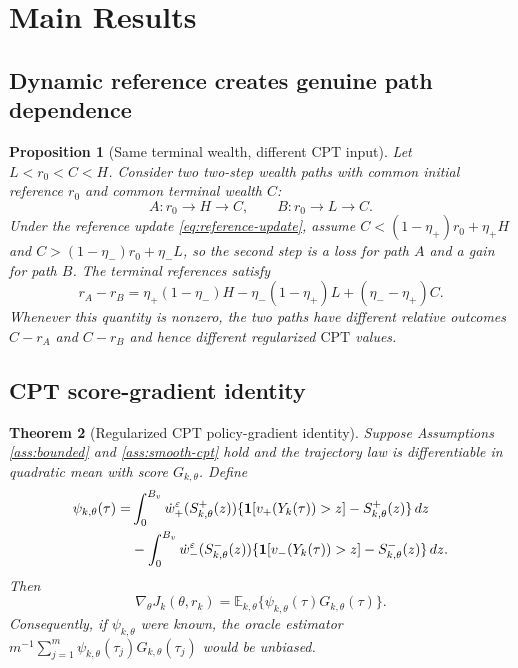 \documentclass[11pt]{article}
\newtheorem{theorem}{Theorem}[section]
\newtheorem{proposition}[theorem]{Proposition}
\newcommand{\E}{\mathbb E}
\newcommand{\1}{\mathbf 1}
\newcommand{\CPT}{\ensuremath{\mathrm{CPT}}\xspace}
\newcommand{\eps}{\varepsilon}
\newcommand{\etaP}{\eta_{+}}
\newcommand{\etaM}{\eta_{-}}
\begin{document}
\section{Main Results}\label{sec:results}

\subsection{Dynamic reference creates genuine path dependence}

\begin{proposition}[Same terminal wealth, different \CPT input]\label{prop:path-dependence}
Let $L<r_0<C<H$.  Consider two two-step wealth paths with common initial reference $r_0$ and common terminal wealth $C$:
\[
 A: r_0\to H\to C,
 \qquad
 B: r_0\to L\to C.
\]
Under the reference update \eqref{eq:reference-update}, assume $C< (1-\etaP)r_0+\etaP H$ and $C>(1-\etaM)r_0+\etaM L$, so the second step is a loss for path $A$ and a gain for path $B$.  The terminal references satisfy
\begin{equation}\label{eq:path-diff}
 r_A-r_B=\etaP(1-\etaM)H-\etaM(1-\etaP)L+(\etaM-\etaP)C.
\end{equation}
Whenever this quantity is nonzero, the two paths have different relative outcomes $C-r_A$ and $C-r_B$ and hence different regularized \CPT values.
\end{proposition}

\subsection{CPT score-gradient identity}

\begin{theorem}[Regularized \CPT policy-gradient identity]\label{thm:gradient-identity}
Suppose Assumptions \ref{ass:bounded} and \ref{ass:smooth-cpt} hold and the trajectory law is differentiable in quadratic mean with score $G_{k,\theta}$.  Define
\begin{align}\label{eq:psi-def}
 \psi_{k,\theta}(\tau)
 =&\int_0^{B_v}\dot w_+^\eps(S^+_{k,\theta}(z))
 \{\1[v_+(Y_k(\tau))>z]-S^+_{k,\theta}(z)\}\,dz\notag\\
 &-\int_0^{B_v}\dot w_-^\eps(S^-_{k,\theta}(z))
 \{\1[v_-(Y_k(\tau))>z]-S^-_{k,\theta}(z)\}\,dz.
\end{align}
Then
\begin{equation}\label{eq:gradient-identity}
 \nabla_\theta J_k(\theta,r_k)=
 \E_{k,\theta}\{\psi_{k,\theta}(\tau)G_{k,\theta}(\tau)\}.
\end{equation}
Consequently, if $\psi_{k,\theta}$ were known, the oracle estimator $m^{-1}\sum_{j=1}^{m}\psi_{k,\theta}(\tau_j)G_{k,\theta}(\tau_j)$ would be unbiased.
\end{theorem}
\end{document}
